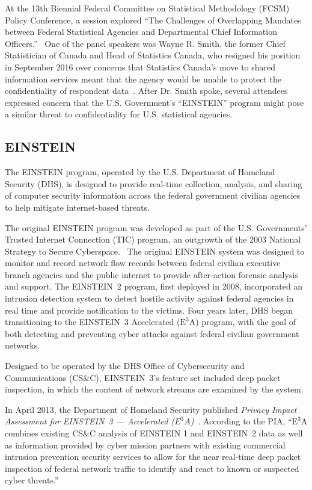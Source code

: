 \documentclass[fleqn,12pt]{wlscirep}
\newcommand{\ETA}{$\textrm{E}^\textrm{3}\textrm{A}$\xspace}
\begin{document}
At the 13th Biennial Federal Committee on Statistical Methodology
(FCSM) Policy Conference, a session explored ``The Challenges of
Overlapping Mandates between Federal Statistical Agencies and
Departmental Chief Information Officers.''~\cite{fcsm-program} One of
the panel speakers was Wayne R. Smith, the former Chief Statistician
of Canada and Head of Statistics Canada, who resigned his position in
September 2016 over concerns that Statistics Canada's  move to shared information services
meant that the agency would be unable to
protect the confidentiality of respondent
data~\cite{ottawacitizen}. After Dr. Smith spoke, several attendees
expressed concern that the U.S. Government's ``EINSTEIN'' program
might pose a similar threat to confidentiality for U.S. statistical agencies. 

\subsection{EINSTEIN}

The EINSTEIN program, operated by the U.S. Department of Homeland
Security (DHS), is designed to provide real-time collection,
analysis, and sharing of computer security information across the
federal government civilian agencies to help mitigate internet-based threats.~\cite{dhs-einstein-2004}

The original EINSTEIN program was developed as part of the U.S.
Governments' Trusted Internet Connection (TIC) program, an outgrowth of the
2003 National Strategy to Secure Cyberspace.~\cite{nstsc-2003}
The original EINSTEIN system was designed to
monitor and record network flow records between federal civilian  executive branch
agencies and the public internet to provide after-action forensic analysis and support. The
EINSTEIN~2 program, first deployed in 2008, incorporated an intrusion
detection system to detect hostile activity against federal agencies
in real time and provide notification to the victims. Four years later, DHS began
transitioning to the EINSTEIN~3 Accelerated (\ETA) program, with the
goal of both detecting and preventing cyber attacks against federal
civilian government  networks.~\cite{dhs-einstein}

Designed to be operated by the DHS Office of Cybersecurity and
Communications (CS\&C), EINSTEIN~3's feature set included deep packet
inspection, in which the content of network streams are examined by
the system. 

In April 2013, the Department of Homeland Security published 
\emph{Privacy Impact Assessment for EINSTEIN~3 --- Accelerated
  ($E^3A$)}~\cite{dhs-e3a-pia}. According to the PIA, ``\ETA combines
existing CS\&C analysis of EINSTEIN 1 and EINSTEIN~2 data as well as
information provided by cyber mission partners with existing
commercial intrusion prevention security services to allow for the
near real-time deep packet inspection of federal network traffic to
identify and react to known or suspected cyber threats.''~\cite[p.4]{dhs-e3a-pia}
\end{document}
